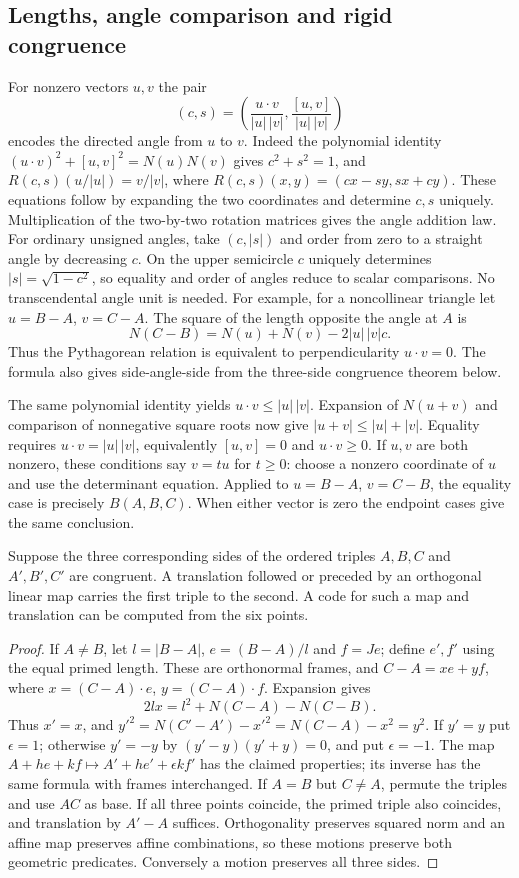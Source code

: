 \subsection{Lengths, angle comparison and rigid congruence}
For nonzero vectors $u,v$ the pair
\[
 (c,s)=\left(\frac{u\cdot v}{|u|\,|v|},
                  \frac{[u,v]}{|u|\,|v|}\right)
\]
encodes the directed angle from $u$ to $v$. Indeed the polynomial identity
$(u\cdot v)^2+[u,v]^2=N(u)N(v)$ gives $c^2+s^2=1$, and
$R(c,s)(u/|u|)=v/|v|$, where
$R(c,s)(x,y)=(cx-sy,sx+cy)$. These equations follow by expanding
the two coordinates and determine $c,s$ uniquely. Multiplication of
the two-by-two rotation matrices gives the angle addition law.
For ordinary unsigned angles, take $(c,|s|)$ and order from zero to
a straight angle by decreasing $c$. On the upper semicircle $c$
uniquely determines $|s|=\sqrt{1-c^2}$, so equality and order of
angles reduce to scalar comparisons. No transcendental angle unit is needed.
For example, for a noncollinear triangle let $u=B-A$, $v=C-A$.
The square of the length opposite the angle at $A$ is
\[
         N(C-B)=N(u)+N(v)-2|u|\,|v|c .
\]
Thus the Pythagorean relation is equivalent to perpendicularity
$u\cdot v=0$. The formula also gives side-angle-side from the
three-side congruence theorem below.

The same polynomial identity yields $u\cdot v\leq |u|\,|v|$.
Expansion of $N(u+v)$ and comparison of nonnegative square roots now
give $|u+v|\leq |u|+|v|$. Equality requires
$u\cdot v=|u|\,|v|$, equivalently $[u,v]=0$ and $u\cdot v\geq0$.
If $u,v$ are both nonzero, these conditions say $v=tu$ for $t\geq0$:
choose a nonzero coordinate of $u$ and use the determinant equation.
Applied to $u=B-A$, $v=C-B$, the equality case is precisely $B(A,B,C)$.
When either vector is zero the endpoint cases give the same conclusion.

\begin{proposition}
Suppose the three corresponding sides of the ordered triples $A,B,C$ and
$A',B',C'$ are congruent. A translation followed or preceded by an
orthogonal linear map carries the first triple to the second. A code
for such a map and translation can be computed from the six points.
\end{proposition}
\begin{proof}
If $A\ne B$, let $l=|B-A|$, $e=(B-A)/l$ and $f=Je$;
define $e',f'$ using the equal primed length. These are orthonormal
frames, and $C-A=xe+yf$, where $x=(C-A)\cdot e$, $y=(C-A)\cdot f$.
Expansion gives
\[
              2lx=l^2+N(C-A)-N(C-B).
\]
Thus $x'=x$, and $y'^2=N(C'-A')-x'^2=N(C-A)-x^2=y^2$.
If $y'=y$ put $\epsilon=1$; otherwise $y'=-y$ by
$(y'-y)(y'+y)=0$, and put $\epsilon=-1$. The map
$A+he+kf\mapsto A'+he'+\epsilon kf'$ has the claimed properties;
its inverse has the same formula with frames interchanged.
If $A=B$ but $C\ne A$, permute the triples and use $AC$ as base.
If all three points coincide, the primed triple also coincides, and
translation by $A'-A$ suffices. Orthogonality preserves squared norm
and an affine map preserves affine combinations, so these motions
preserve both geometric predicates. Conversely a motion preserves all
three sides.
\end{proof}
